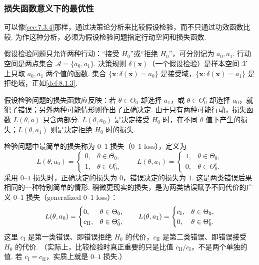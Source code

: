 \subsubsection{损失函数意义下的最优性}\label{sec:8.3.5}
可以像\autoref{sec:7.3.4}那样，通过决策论分析来比较假设检验，而不只通过功效函数比较. 为作这种分析，必须为假设检验问题指定行动空间和损失函数.

假设检验问题只允许两种行动：“接受 $H_0$”或“拒绝 $H_0$”，可分别记为 $a_0,a_1$. 行动空间是两点集合 $\mathscr A=\{a_0,a_1\}$. 决策规则 $\delta(\boldsymbol x)$（一个假设检验）是样本空间 $\mathscr X$ 上只取 $a_0,a_1$ 两个值的函数. 集合 $\{\boldsymbol x:\delta(\boldsymbol x)=a_0\}$ 是接受域，$\{\boldsymbol x:\delta(\boldsymbol x)=a_1\}$ 是拒绝域，正如\autoref{def:8.1.3}.

假设检验问题的损失函数应反映：若 $\theta\in\Theta_0$ 却选择 $a_1$，或 $\theta\in\Theta_0^c$ 却选择 $a_0$，就犯了错误；另外两种可能情形则作出了正确决定. 由于只有两种可能行动，损失函数 $L(\theta,a)$ 只含两部分. $L(\theta,a_0)$ 是决定接受 $H_0$ 时，在不同 $\theta$ 值下产生的损失；$L(\theta,a_1)$ 则是决定拒绝 $H_0$ 时的损失.

检验问题中最简单的损失称为 $0$–$1$ 损失（$0$–$1$ loss），定义为
$$L(\theta,a_0)=\begin{cases}0,&\theta\in\Theta_0,\\1,&\theta\in\Theta_0^c,\end{cases}
\qquad L(\theta,a_1)=\begin{cases}1,&\theta\in\Theta_0,\\0,&\theta\in\Theta_0^c.\end{cases}$$
采用 $0$–$1$ 损失时，正确决定的损失为 $0$，错误决定的损失为 $1$. 这是两类错误后果相同的一种特别简单的情形. 稍微更现实的损失，是为两类错误赋予不同代价的广义 $0$–$1$ 损失（generalized $0$–$1$ loss）：
\begin{equation}\label{eq:8.3.11}\index{SI0655@广义零一}\index{SI0656@假设检验}\index{SI0663@零一}
L(\theta,a_0)=\begin{cases}0,&\theta\in\Theta_0,\\c_{\mathrm{II}},&\theta\in\Theta_0^c,\end{cases}
\qquad L(\theta,a_1)=\begin{cases}c_{\mathrm I},&\theta\in\Theta_0,\\0,&\theta\in\Theta_0^c.\end{cases}
\end{equation}
这里 $c_{\mathrm I}$ 是第一类错误、即错误拒绝 $H_0$ 的代价，$c_{\mathrm{II}}$ 是第二类错误、即错误接受 $H_0$ 的代价. （实际上，比较检验时真正重要的只是比值 $c_{\mathrm{II}}/c_{\mathrm I}$，不是两个单独的值. 若 $c_{\mathrm I}=c_{\mathrm{II}}$，实质上就是 $0$–$1$ 损失.）

